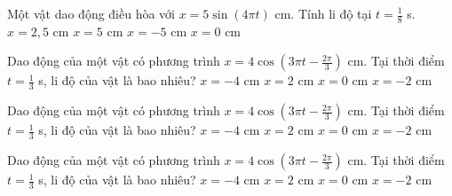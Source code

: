 \begin{ex}
Một vật dao động điều hòa với $x = 5\sin(4\pi t)$ cm. Tính li độ tại $t = \frac{1}{8}$ s.
\choice
{$x = 2{,}5$ cm}
{\True $x = 5$ cm}
{$x = -5$ cm}
{$x = 0$ cm}
\end{ex}

\begin{ex}
Dao động của một vật có phương trình $x = 4\cos(3\pi t - \frac{2\pi}{3})$ cm. Tại thời điểm $t = \frac{1}{3}$ s, li độ của vật là bao nhiêu?
\choice
{$x = -4$ cm}
{\True $x = 2$ cm}
{$x = 0$ cm}
{$x = -2$ cm}
\end{ex}

\begin{ex}
Dao động của một vật có phương trình $x = 4\cos(3\pi t - \frac{2\pi}{3})$ cm. Tại thời điểm $t = \frac{1}{3}$ s, li độ của vật là bao nhiêu?
\choice
{$x = -4$ cm}
{\True $x = 2$ cm}
{$x = 0$ cm}
{$x = -2$ cm}
\end{ex}

\begin{ex}
Dao động của một vật có phương trình $x = 4\cos(3\pi t - \frac{2\pi}{3})$ cm. Tại thời điểm $t = \frac{1}{3}$ s, li độ của vật là bao nhiêu?
\choice
{$x = -4$ cm}
{\True $x = 2$ cm}
{$x = 0$ cm}
{$x = -2$ cm}
\end{ex}

